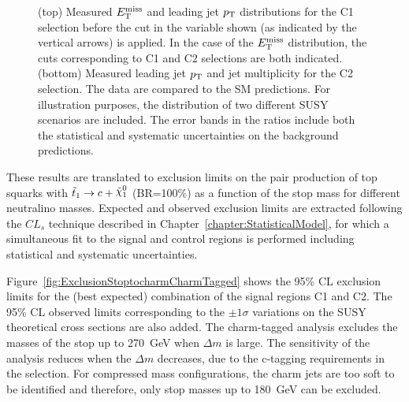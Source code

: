 \begin{figure}[!ht]
\begin{center}
{    }
  \end{center}
  \caption[Several kinematic distributions in the C1 and C2 signal regions for the charm-tagged analysis.]{(top) Measured $E_{\mathrm{T}}^{\mathrm{miss}}$ and leading jet $p_{\mathrm{T}}$ distributions for the C1 selection before the cut in the variable shown (as indicated by the vertical arrows) is applied. In the case of the $E_{\mathrm{T}}^{\mathrm{miss}}$ distribution, the cuts corresponding to C1 and C2 selections are both indicated.
  (bottom) Measured leading jet $p_{\mathrm{T}}$ and jet multiplicity for the C2 selection. The data are compared to the SM predictions. For illustration purposes, the distribution of two different SUSY scenarios are included. The error bands in the ratios include both the statistical and systematic uncertainties on the background predictions.}
\label{fig:Plot_CharmTagged_SR_Jetkinematics}
\end{figure}

These results are translated to exclusion limits on the pair production of top squarks with $\stoptocharm$ (BR=100\%) as a function of the stop mass for different neutralino masses.
Expected and observed exclusion limits are extracted following the $CL_s$ technique described in Chapter~\ref{chapter:StatisticalModel}, for which a simultaneous fit to the signal and control regions is performed including statistical and systematic uncertainties.

Figure~\ref{fig:ExclusionStoptocharmCharmTagged} shows the 95\% CL exclusion limits for the (best expected) combination of the signal regions C1 and C2. 
The 95\% CL observed limits corresponding to the $\pm 1 \sigma$ variations on the SUSY theoretical cross sections are also added.
The charm-tagged analysis excludes the masses of the stop up to 270~GeV when $\Delta m$ is large.
The sensitivity of the analysis reduces when the $\Delta m$ decreases, due to the c-tagging requirements in the selection.
For compressed mass configurations, the charm jets are too soft to be identified and therefore, only stop masses up to 180~GeV can be excluded.

